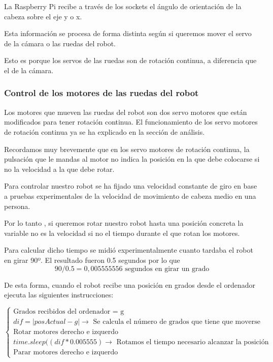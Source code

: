 \documentclass[twoside, 12pt]{epstfg}
\begin{document}
La Raspberry Pi recibe a través de los sockets el ángulo de orientación de la cabeza sobre el eje y o x.


Esta información se procesa de forma distinta según si queremos mover el servo de la cámara o las ruedas del robot.

Esto es porque los servos de las ruedas son de rotación continua, a diferencia que el de la cámara.

\subsubsection{Control de los motores de las ruedas del robot}

Los motores que mueven las ruedas del robot son dos servo motores que están modificados para tener rotación continua. El funcionamiento de los servo motores de rotación continua ya se ha explicado en la sección de análisis.

Recordamos muy brevemente que en los servo motores de rotación continua, la pulsación que le mandas al motor no indica la posición en la que debe colocarse si no la velocidad a la que debe rotar.

Para controlar nuestro robot se ha fijado una velocidad constante de giro en base a pruebas experimentales de la velocidad de movimiento de cabeza medio en una persona.

Por lo tanto , si queremos rotar nuestro robot hasta una posición concreta la variable no es la velocidad si no el tiempo durante el que rotan los motores.

Para calcular dicho tiempo se midió experimentalmente cuanto tardaba el robot en girar 90º. El resultado fueron 0.5 segundos por lo que 
$$90 / 0.5 = 0,005555556 \text{ segundos en girar un grado}$$

De esta forma, cuando el robot recibe una posición en grados desde el ordenador ejecuta las siguientes instrucciones:


$\begin{cases}
\text{Grados recibidos del ordenador = g}\\
dif = |posActual-g|\rightarrow\text{ Se calcula el número de grados que tiene que moverse}\\
\text{Rotar motores derecho e izquerdo}\\
time.sleep((dif*0.005555) \rightarrow \text{ Rotamos el tiempo necesario alcanzar la posición}\\
\text{Parar motores derecho e izquerdo}
\end{cases}$
\end{document}
